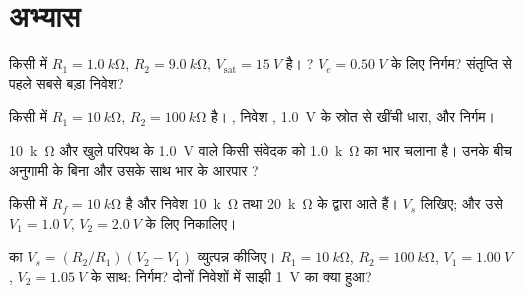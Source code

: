 \section{अभ्यास}

\begin{exercise}[$\star$]\label{exo:b1:operational-amplifier:1}
किसी  में $R_1 = \qty{1.0}{k\ohm}$, $R_2 =
\qty{9.0}{k\ohm}$, $V_{\mathrm{sat}} = \qty{15}{V}$ है। ?
$V_e = \qty{0.50}{V}$ के लिए निर्गम? संतृप्ति से पहले सबसे बड़ा निवेश?
\end{exercise}

\begin{exercise}[$\star$]\label{exo:b1:operational-amplifier:2}
किसी  में $R_1 = \qty{10}{k\ohm}$, $R_2 = \qty{100}{k\ohm}$ है।
, निवेश , \qty{1.0}{V} के स्रोत से खींची धारा, और निर्गम।
\end{exercise}

\begin{exercise}[$\star$]\label{exo:b1:operational-amplifier:3}
 \qty{10}{k\ohm} और खुले परिपथ के 
\qty{1.0}{V} वाले किसी संवेदक को \qty{1.0}{k\ohm} का भार चलाना है। उनके बीच
अनुगामी के बिना और उसके साथ भार के आरपार ?
\end{exercise}

\begin{exercise}[$\star$]\label{exo:b1:operational-amplifier:4}
किसी  में $R_f = \qty{10}{k\ohm}$ है और निवेश
\qty{10}{k\ohm} तथा \qty{20}{k\ohm} के द्वारा आते हैं। $V_s$ लिखिए; और उसे
$V_1 = \qty{1.0}{V}$, $V_2 = \qty{2.0}{V}$ के लिए निकालिए।
\end{exercise}

\begin{exercise}[$\star\star$]\label{exo:b1:operational-amplifier:5}
 का $V_s = (R_2/R_1)(V_2 - V_1)$ व्युत्पन्न कीजिए।
$R_1 = \qty{10}{k\ohm}$, $R_2 = \qty{100}{k\ohm}$, $V_1 = \qty{1.00}{V}$,
$V_2 = \qty{1.05}{V}$ के साथ: निर्गम? दोनों निवेशों में साझी \qty{1}{V}
का क्या हुआ?
\end{exercise}

